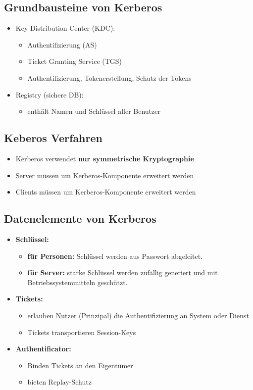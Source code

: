 \subsection{Grundbausteine von Kerberos}
\begin{itemize}
	\item Key Distribution Center (KDC):
	\begin{itemize}
		\item Authentifizierung (AS)
		\item Ticket Granting Service (TGS) 
		\item Authentifizierung, Tokenerstellung, Schutz der Tokens
	\end{itemize}
	\item Registry (sichere DB):
	\begin{itemize}
		\item enthält Namen und Schlüssel aller Benutzer 
	\end{itemize}
\end{itemize}

\subsection{Keberos Verfahren}
\begin{itemize}
	\item Kerberos verwendet \textbf{nur symmetrische Kryptographie}
	\item Server müssen um Kerberos-Komponente erweitert werden
	\item Clients müssen um Kerberos-Komponente erweitert werden
\end{itemize}

\subsection{Datenelemente von Kerberos}
\begin{itemize}
	\item \textbf{Schlüssel:}
	\begin{itemize}
		\item \textbf{für Personen:} Schlüssel werden aus Passwort abgeleitet. 
		\item \textbf{für Server:} starke Schlüssel werden zufällig generiert und mit Betriebssystemmitteln geschützt.
	\end{itemize} 
	\item \textbf{Tickets:}
	\begin{itemize}
		\item erlauben Nutzer (Prinzipal) die Authentifizierung an System oder Dienst
		\item Tickets transportieren Session-Keys
	\end{itemize}
	\item \textbf{Authentificator:}
	\begin{itemize}
		\item Binden Tickets an den Eigentümer
		\item bieten Replay-Schutz
	\end{itemize}
\end{itemize}

